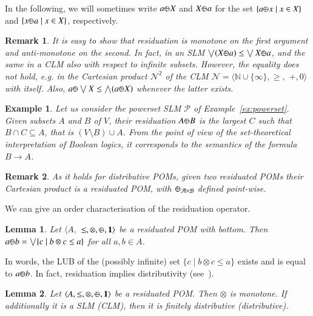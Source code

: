 \documentclass[a4paper]{elsarticle}
\newtheorem{example}{Example}
\newtheorem{remark}{Remark}
\newtheorem{lemma}{Lemma}
\newcommand{\monop}{\otimes}
\newcommand{\1}{\mathbf{1}}
\def\odiv{{ \ominus\hspace{-8pt}:}\;}
\begin{document}
In the following, we will sometimes write $a \odiv X$ and $X \odiv a$
for the set  $\{a \odiv x \mid x \in X\}$ and  $\{x \odiv a \mid x \in X\}$,
respectively.

\begin{remark}\label{natural}
	It is easy to show that residuation is monotone on the first argument and
	anti-monotone on the second. In fact, in an SLM 
	$\bigvee (X \odiv a) \leq \bigvee X \odiv a$,
	and the same in a CLM also with respect to infinite subsets.
	However, the equality does not hold,
	e.g. in the Cartesian product $\mathcal{N}^2$ of the CLM  
	$\mathcal{N} = \langle \mathbb{N} \cup \{\infty\}, \geq,$ $+, 0 \rangle$ with itself.
	Also, 
	$a \odiv \bigvee X \leq \bigwedge (a \odiv X)$
	whenever the latter exists. %
\end{remark}

\begin{example}
Let us consider the powerset SLM $\mathcal{P}$ of Example~\ref{ex:powerset}. 
Given subsets $A$ and $B$ of $V$, their residuation $A \odiv B$ 
is the largest $C$ such that $B \cap C \subseteq A$, that is $(V \setminus B) \cup A$. From the point of view
of the set-theoretical interpretation of Boolean logics, it corresponds to the semantics of the formula $B \rightarrow A$.
\end{example}

\begin{remark}
	\label{remarkC}
	As it holds for distributive POMs, given two residuated POMs their Cartesian product
	is a residuated POM, with $\odiv_{\mathcal{A} \times \mathcal{B}}$ defined point-wise.
\end{remark}

We can give an order characterisation of the residuation operator.

\begin{lemma}\label{rclm1}
	Let $\langle A,$ $\leq, \otimes,  \odiv, \1 \rangle$ be a residuated POM with bottom.
	Then $a \odiv b = \bigvee \{c \mid b \otimes c \leq a\}$ for all $a, b \in A$.
\end{lemma}

In words, the LUB of the (possibly infinite) set 
$\{c \mid b \otimes c \leq a\}$ exists and is equal to $a \odiv b$.
%
In fact, residuation implies distributivity (see~\cite[Lemma 2.2]{ipl}).

\begin{lemma}\label{rclm2}
	Let $\langle A, \leq, \monop, \odiv, \1 \rangle$ be a residuated POM. 
	Then $\monop$ is monotone.
	If additionally it is a SLM (CLM), then it is finitely distributive
	(distributive).
\end{lemma}
\end{document}
